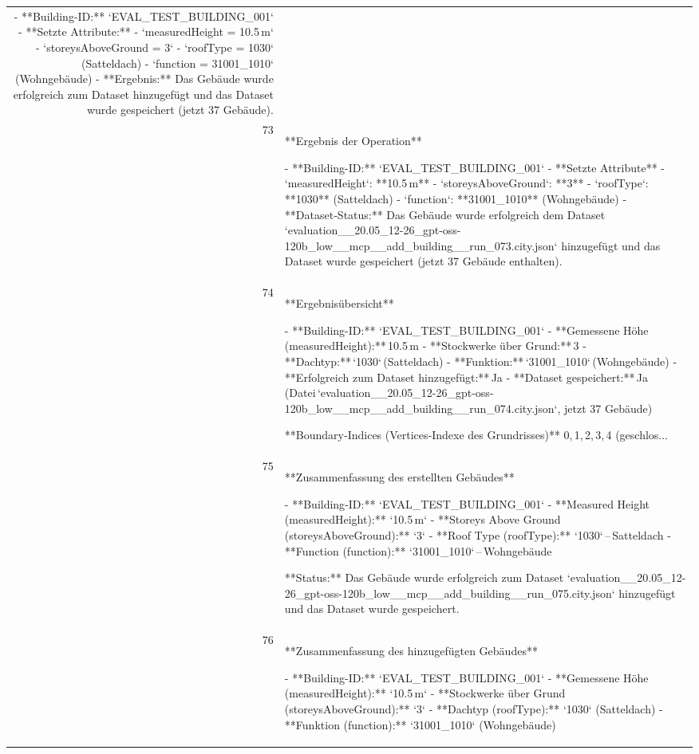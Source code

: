 \documentclass[a4paper,11pt]{article}
\begin{document}
\begin{table}[ht]
\begin{tabular}{r p{12cm}}
- **Building-ID:** `EVAL\_TEST\_BUILDING\_001`  
- **Setzte Attribute:**  
  - `measuredHeight = 10.5 m`  
  - `storeysAboveGround = 3`  
  - `roofType = 1030` (Satteldach)  
  - `function = 31001\_1010` (Wohngebäude)  
- **Ergebnis:** Das Gebäude wurde erfolgreich zum Dataset hinzugefügt und das Dataset wurde gespeichert (jetzt 37 Gebäude). \\
73 & **Ergebnis der Operation**

- **Building-ID:** `EVAL\_TEST\_BUILDING\_001`  
- **Setzte Attribute**  
  - `measuredHeight`: **10.5 m**  
  - `storeysAboveGround`: **3**  
  - `roofType`: **1030** (Satteldach)  
  - `function`: **31001\_1010** (Wohngebäude)  
- **Dataset‑Status:** Das Gebäude wurde erfolgreich dem Dataset `evaluation\_\_20.05\_12-26\_gpt-oss-120b\_low\_\_mcp\_\_add\_building\_\_run\_073.city.json` hinzugefügt und das Dataset wurde gespeichert (jetzt 37 Gebäude enthalten). \\
74 & **Ergebnisübersicht**

- **Building-ID:** `EVAL\_TEST\_BUILDING\_001`  
- **Gemessene Höhe (measuredHeight):** 10.5 m  
- **Stockwerke über Grund:** 3  
- **Dachtyp:** `1030` (Satteldach)  
- **Funktion:** `31001\_1010` (Wohngebäude)  
- **Erfolgreich zum Dataset hinzugefügt:** Ja  
- **Dataset gespeichert:** Ja (Datei `evaluation\_\_20.05\_12-26\_gpt-oss-120b\_low\_\_mcp\_\_add\_building\_\_run\_074.city.json`, jetzt 37 Gebäude)  

**Boundary‑Indices (Vertices‑Indexe des Grundrisses)**  
0, 1, 2, 3, 4 (geschlos... \\
75 & **Zusammenfassung des erstellten Gebäudes**

- **Building‑ID:** `EVAL\_TEST\_BUILDING\_001`  
- **Measured Height (measuredHeight):** `10.5 m`  
- **Storeys Above Ground (storeysAboveGround):** `3`  
- **Roof Type (roofType):** `1030` – Satteldach  
- **Function (function):** `31001\_1010` – Wohngebäude  

**Status:** Das Gebäude wurde erfolgreich zum Dataset `evaluation\_\_20.05\_12-26\_gpt-oss-120b\_low\_\_mcp\_\_add\_building\_\_run\_075.city.json` hinzugefügt und das Dataset wurde gespeichert. \\
76 & **Zusammenfassung des hinzugefügten Gebäudes**

- **Building-ID:** `EVAL\_TEST\_BUILDING\_001`  
- **Gemessene Höhe (measuredHeight):** `10.5 m`  
- **Stockwerke über Grund (storeysAboveGround):** `3`  
- **Dachtyp (roofType):** `1030` (Satteldach)  
- **Funktion (function):** `31001\_1010` (Wohngebäude)  


\end{tabular}
\end{table}
\end{document}

